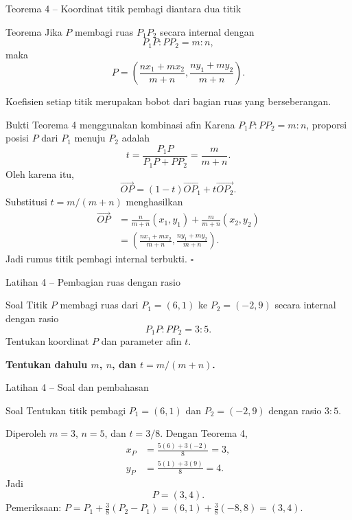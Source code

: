 \documentclass[aspectratio=169,11pt]{beamer}
\begin{document}
\begin{frame}{Teorema 4 -- Koordinat titik pembagi diantara dua titik}
    \begin{block}{Teorema}
        Jika $P$ membagi ruas $P_1P_2$ secara internal dengan
        \[
            P_1P:PP_2=m:n,
        \]
        maka
        \[
            \boxed{P=\left(\frac{nx_1+mx_2}{m+n},
            \frac{ny_1+my_2}{m+n}\right)}.
        \]
    \end{block}

    Koefisien setiap titik merupakan bobot dari bagian ruas yang berseberangan.
    
\end{frame}

\begin{frame}{Bukti Teorema 4 menggunakan kombinasi afin}
    Karena $P_1P:PP_2=m:n$, proporsi posisi $P$ dari $P_1$ menuju $P_2$ adalah
    \[
        t=\frac{P_1P}{P_1P+PP_2}=\frac{m}{m+n}.
    \]
    Oleh karena itu,
    \[
        \overrightarrow{OP}
        =(1-t)\overrightarrow{OP_1}+t\overrightarrow{OP_2}.
    \]
    Substitusi $t=m/(m+n)$ menghasilkan
    \[
    \begin{aligned}
        \overrightarrow{OP}
        &=\frac{n}{m+n}(x_1,y_1)+\frac{m}{m+n}(x_2,y_2)\\
        &=\left(\frac{nx_1+mx_2}{m+n},
        \frac{ny_1+my_2}{m+n}\right).
    \end{aligned}
    \]
    Jadi rumus titik pembagi internal terbukti. \hfill$\square$
\end{frame}

\begin{frame}{Latihan 4 -- Pembagian ruas dengan rasio}
    \begin{block}{Soal}
        Titik $P$ membagi ruas dari $P_1=(6,1)$ ke $P_2=(-2,9)$ secara internal
        dengan rasio
        \[
            P_1P:PP_2=3:5.
        \]
        Tentukan koordinat $P$ dan parameter afin $t$.
    \end{block}
    \vspace{0.35cm}
    \centering
    \color{AcademicBlue}\bfseries Tentukan dahulu $m$, $n$, dan $t=m/(m+n)$.
\end{frame}

\begin{frame}{Latihan 4 -- Soal dan pembahasan}
    \begin{exampleblock}{Soal}
        Tentukan titik pembagi $P_1=(6,1)$ dan $P_2=(-2,9)$ dengan rasio $3:5$.
    \end{exampleblock}

    Diperoleh $m=3$, $n=5$, dan $t=3/8$. Dengan Teorema 4,
    \[
    \begin{aligned}
        x_P&=\frac{5(6)+3(-2)}{8}=3,\\
        y_P&=\frac{5(1)+3(9)}{8}=4.
    \end{aligned}
    \]
    Jadi
    \[
        \boxed{P=(3,4)}.
    \]
    Pemeriksaan: $P=P_1+\frac38(P_2-P_1)=(6,1)+\frac38(-8,8)=(3,4)$.
\end{frame}
\end{document}
